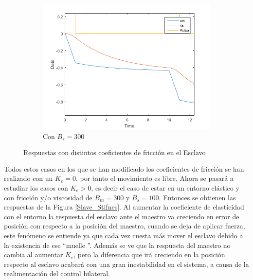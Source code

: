 \documentclass[a4paper, fontsize=11pt]{scrartcl} %
\numberwithin{equation}{section} %
\numberwithin{figure}{section} %
\numberwithin{table}{section} %
\begin{document}
\begin{figure}[h!]
\begin{subfigure}[t]{.5\textwidth}
			\includegraphics[width=1\linewidth]{images/Bs300.PNG}
			\caption{Con $B_s = 300$}
			\label{Bs300}
		\end{subfigure}
		\caption{Respuestas con distintos coeficientes de fricción en el Esclavo}
		\label{Slave_Friction}
	\end{figure}
	\FloatBarrier
	
	Todos estos casos en los que se han modificado los coeficientes de fricción se han realizado con un $K_e = 0$, por tanto el movimiento es libre, Ahora se pasará a estudiar los casos con $K_e > 0$, es decir el caso de estar en un entorno elástico y con fricción y/o viscosidad de $B_m = 300$ y $B_s = 100$. Entonces se obtienen las respuestas de la Figura \ref{Slave_Stifnes}. Al aumentar la coeficiente de elasticidad con el entorno la respuesta del esclavo ante el maestro va creciendo en error de posición con respecto a la posición del maestro, cuando se deja de aplicar fuerza, este fenómeno se entiende ya que cada vez cuesta más mover el esclavo debido a la existencia de ese \textquotedblleft muelle \textquotedblright. Además se ve que la respuesta del maestro no cambia al aumentar $K_e$, pero la diferencia que irá creciendo en la posición respecto al esclavo acabará con una gran inestabilidad en el sistema, a causa de la realimentación del control bilateral.\\
	
\end{document}
